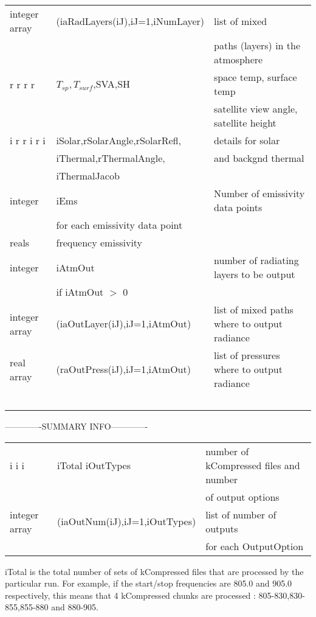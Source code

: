 \documentclass[12pt]{article}
\newlength{\colwidth}
\begin{document}
{{{{\begin{small}
\begin{longtable}{llp{\colwidth}}
{\sf integer array} &\indent(iaRadLayers(iJ),iJ=1,iNumLayer) & list of mixed \\
                    &                 & paths (layers) in the atmosphere\\
{\sf r r r r} &\indent $T_{sp},T_{surf}$,SVA,SH &space temp, surface temp\\
              &          &  satellite view angle, satellite height\\
{\sf i r r i r i} &\indent iSolar,rSolarAngle,rSolarRefl,& details for solar\\
                  &\indent iThermal,rThermalAngle,  &and backgnd thermal\\
                  &\indent iThermalJacob & \\
{\sf integer} & \indent iEms & Number of emissivity data points\\
              & \indent for each emissivity data point &\\
{\sf reals}   & \indent \indent frequency emissivity &\\
{\sf integer} & \indent iAtmOut & number of radiating layers to be output\\
              & \indent if iAtmOut $>$ 0 & \\
{\sf integer array}  & \indent \indent (iaOutLayer(iJ),iJ=1,iAtmOut) &list 
  of mixed paths where to output radiance\\
{\sf real array}     & \indent \indent (raOutPress(iJ),iJ=1,iAtmOut) &list 
  of pressures where to output radiance\\\
\end{longtable}
\end{small}
-------------SUMMARY INFO-------------\\
\begin{small}
\begin{longtable}{llp{\colwidth}}
{\sf i i i} & \indent iTotal iOutTypes &number of kCompressed files and 
                                       number\\
            & &                        of output options\\
{\sf integer array}  & \indent \indent (iaOutNum(iJ),iJ=1,iOutTypes) 
    &list   of number of outputs \\
    &        & for each OutputOption\\
\end{longtable}
\end{small}

iTotal is the total number of sets of kCompressed files that are processed by
the particular run. For example, if the start/stop frequencies are 805.0 and 
905.0 respectively, this means that 4 kCompressed chunks are processed : 
805-830,830-855,855-880 and 880-905. \\

}}}}
\end{document}
